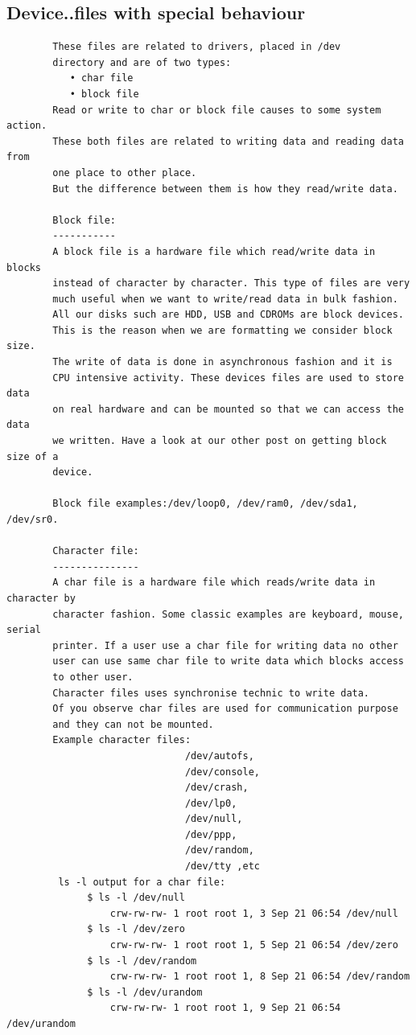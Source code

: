 \documentclass[a4paper,12pt]{article}
\begin{document}
\subsection{Device..files with special behaviour }
\begin{verbatim}
        These files are related to drivers, placed in /dev 
        directory and are of two types:
           • char file
           • block file
        Read or write to char or block file causes to some system action. 
        These both files are related to writing data and reading data from
        one place to other place. 
        But the difference between them is how they read/write data.  
        
        Block file:
        -----------
        A block file is a hardware file which read/write data in blocks
        instead of character by character. This type of files are very
        much useful when we want to write/read data in bulk fashion.
        All our disks such are HDD, USB and CDROMs are block devices.
        This is the reason when we are formatting we consider block size.
        The write of data is done in asynchronous fashion and it is 
        CPU intensive activity. These devices files are used to store data
        on real hardware and can be mounted so that we can access the data
        we written. Have a look at our other post on getting block size of a       
        device.

        Block file examples:/dev/loop0, /dev/ram0, /dev/sda1, /dev/sr0.
        
        Character file: 
        ---------------
        A char file is a hardware file which reads/write data in character by    
        character fashion. Some classic examples are keyboard, mouse, serial 
        printer. If a user use a char file for writing data no other 
        user can use same char file to write data which blocks access
        to other user. 
        Character files uses synchronise technic to write data. 
        Of you observe char files are used for communication purpose
        and they can not be mounted.
        Example character files: 
                               /dev/autofs,
                               /dev/console,
                               /dev/crash,
                               /dev/lp0, 
                               /dev/null, 
                               /dev/ppp, 
                               /dev/random, 
                               /dev/tty ,etc
         ls -l output for a char file:
              $ ls -l /dev/null
                  crw-rw-rw- 1 root root 1, 3 Sep 21 06:54 /dev/null
              $ ls -l /dev/zero
                  crw-rw-rw- 1 root root 1, 5 Sep 21 06:54 /dev/zero
﻿              $ ls -l /dev/random
                  crw-rw-rw- 1 root root 1, 8 Sep 21 06:54 /dev/random
﻿              $ ls -l /dev/urandom
                  crw-rw-rw- 1 root root 1, 9 Sep 21 06:54 /dev/urandom


\end{verbatim}
\end{document}
